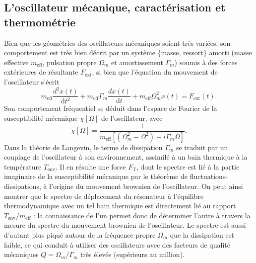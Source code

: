\documentclass[12pt,a4paper]{article}
\renewcommand{\d}{\mathrm{d}}
\begin{document}
\subsection{L'oscillateur mécanique, caractérisation et thermométrie}

Bien que les géométries des oscillateurs mécaniques soient très variées, son comportement est très bien décrit par un système \{masse, ressort\} amorti (masse effective $m_\mathrm{eff}$, pulsation propre $\Omega_m$ et amortissement $\Gamma_m$) soumis à des forces extérieures de résultante $F_\mathrm{ext}$, si bien que l'équation du mouvement de l'oscillateur s'écrit
\begin{equation}
m_\mathrm{eff} \frac{d^2 x(t)}{\d t^2} + m_\mathrm{eff}\Gamma_m \frac{d x(t)}{\d t} + m_\mathrm{eff} \Omega_m^2 x(t) = F_\mathrm{ext}(t).
\end{equation}
Son comportement fréquentiel se déduit dans l'espace de Fourier de la susceptibilité mécanique $\chi[\Omega]$ de l'oscillateur, avec
\begin{equation}
\chi[\Omega] = \frac{1}{m_\mathrm{eff}[(\Omega_m^2-\Omega^2)-i\Gamma_m\Omega]}.
\end{equation}
Dans la théorie de Langevin, le terme de dissipation $\Gamma_m$ se traduit par un couplage de l'oscillateur à son environnement, assimilé à un bain thermique à la température $T_\mathrm{env}$.
Il en résulte une force $F_\mathrm{T}$, dont le spectre est lié à la partie imaginaire de la susceptibilité mécanique par le théorème de fluctuations-dissipations, à l'origine du mouvement brownien de l'oscillateur.
On peut ainsi montrer que le spectre de déplacement du résonateur à l'équilibre thermodynamique avec un tel bain thermique est directement lié au rapport $T_\mathrm{env}/m_\mathrm{eff}$ : la connaissance de l'un permet donc de déterminer l'autre à travers la mesure du spectre du mouvement brownien de l'oscillateur.
Le spectre est aussi d'autant plus piqué autour de la fréquence propre $\Omega_m$ que la dissipation est faible, ce qui conduit à utiliser des oscillateurs avec des facteurs de qualité mécaniques $Q=\Omega_m/\Gamma_m$ très élevés (supérieurs au million).
\end{document}
